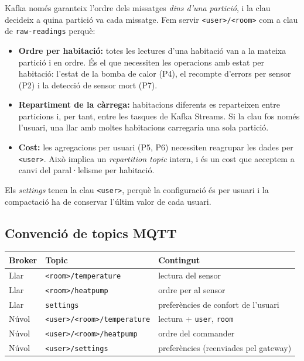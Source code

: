 \documentclass[11pt,a4paper]{article}
\begin{document}
Kafka només garanteix l'ordre dels missatges \emph{dins d'una partició}, i la
clau decideix a quina partició va cada missatge. Fem servir
\texttt{<user>/<room>} com a clau de \texttt{raw-readings} perquè:
\begin{itemize}
  \item \textbf{Ordre per habitació:} totes les lectures d'una habitació van
        a la mateixa partició i en ordre. És el que necessiten les
        operacions amb estat per habitació: l'estat de la bomba de calor
        (P4), el recompte d'errors per sensor (P2) i la detecció de sensor
        mort (P7).
  \item \textbf{Repartiment de la càrrega:} habitacions diferents es
        reparteixen entre particions i, per tant, entre les tasques de Kafka
        Streams. Si la clau fos només l'usuari, una llar amb moltes
        habitacions carregaria una sola partició.
  \item \textbf{Cost:} les agregacions per usuari (P5, P6) necessiten
        reagrupar les dades per \texttt{<user>}. Això implica un
        \emph{repartition topic} intern, i és un cost que acceptem a canvi
        del paral·lelisme per habitació.
\end{itemize}
Els \emph{settings} tenen la clau \texttt{<user>}, perquè la configuració és
per usuari i la compactació ha de conservar l'últim valor de cada usuari.

\subsection{Convenció de topics MQTT}

\begin{center}
\begin{tabular}{@{}lll@{}}
\toprule
Broker & Topic & Contingut \\
\midrule
Llar  & \texttt{<room>/temperature} & lectura del sensor \\
Llar  & \texttt{<room>/heatpump} & ordre per al sensor \\
Llar  & \texttt{settings} & preferències de confort de l'usuari \\
Núvol & \texttt{<user>/<room>/temperature} & lectura + \texttt{user}, \texttt{room} \\
Núvol & \texttt{<user>/<room>/heatpump} & ordre del commander \\
Núvol & \texttt{<user>/settings} & preferències (reenviades pel gateway) \\
\bottomrule
\end{tabular}
\end{center}
\end{document}
